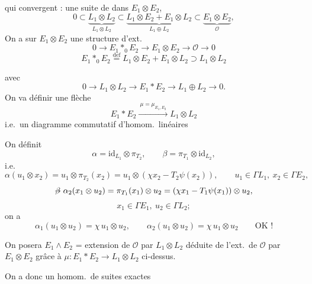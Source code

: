 \documentclass[11pt,a4paper]{article}
\begin{document}
qui convergent : une suite de  dans $E_1 \otimes E_2$,
\[
  0 \subset \underbrace{L_1 \otimes L_2}_{L_1 \otimes L_2}
  \subset \underbrace{L_1 \otimes E_2 + E_1 \otimes L_2}_{L_1 \oplus L_2}
  \subset \underbrace{E_1 \otimes E_2}_{\mathcal{O}},
\]
On a sur $E_1 \otimes E_2$ une structure d'ext.
\[
  0 \to E_1 *_0 E_2 \to E_1 \otimes E_2 \to \mathcal{O} \to 0
\]
\[
  E_1 *_0 E_2 \overset{\mathrm{def}}{=} L_1 \otimes E_2 + E_1 \otimes L_2 \supset L_1 \otimes L_2
\]

avec
\[
  0 \to L_1 \otimes L_2 \to E_1 * E_2 \to L_1 \oplus L_2 \to 0 .
\]
On va définir une flèche
\[
  E_1 * E_2 \xrightarrow{\ \mu = \mu_{E_1,E_2}\ } L_1 \otimes L_2
\]
i.e.\ un diagramme commutatif d'homom.\ linéaires


On définit
\[
  \alpha = \mathrm{id}_{L_1} \otimes \pi_{T_2}, \qquad \beta = \pi_{T_1} \otimes \mathrm{id}_{L_2},
\]
i.e.
\[
  \alpha(u_1 \otimes x_2) = u_1 \otimes \pi_{T_2}(x_2) = u_1 \otimes (\chi x_2 - T_2\psi(x_2)),
  \qquad u_1 \in \Gamma L_1,\ x_2 \in \Gamma E_2,
\]
\[
  \text{\struck{$\beta$}}\ \alpha_2(x_1 \otimes u_2) = \pi_{T_1}(x_1) \otimes u_2
  = (\chi x_1 - T_1\psi(x_1)) \otimes u_2,
\]
\[
  x_1 \in \Gamma E_1,\ u_2 \in \Gamma L_2 ;
\]
on a
\[
  \alpha_1(u_1 \otimes u_2) = \chi\, u_1 \otimes u_2, \qquad
  \alpha_2(u_1 \otimes u_2) = \chi\, u_1 \otimes u_2 \qquad \text{OK !}
\]

On posera
$E_1 \wedge E_2$ = extension de $\mathcal{O}$ par $L_1 \otimes L_2$ déduite de l'ext.\ de $\mathcal{O}$ par  $E_1 \otimes E_2$ grâce à
$\mu : E_1 * E_2 \to L_1 \otimes L_2$ ci-dessus.

On a donc un homom.\ de suites exactes
\end{document}
